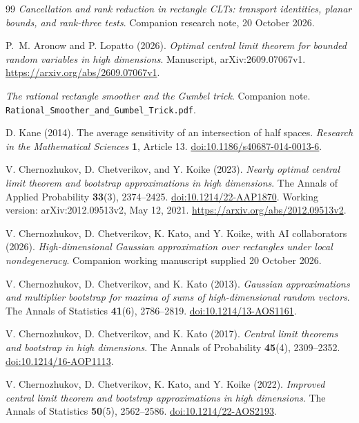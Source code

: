 \documentclass[11pt,letterpaper]{article}
\theoremstyle{remark}
\begin{document}
\begin{thebibliography}{99}
\emph{Cancellation and rank reduction in rectangle CLTs:
transport identities, planar bounds, and rank-three tests}.
Companion research note, 20 October 2026.

P.~M. Aronow and P. Lopatto (2026).
\emph{Optimal central limit theorem for bounded random variables in high dimensions}.
Manuscript, arXiv:2609.07067v1.
\url{https://arxiv.org/abs/2609.07067v1}.

\emph{The rational rectangle smoother and the Gumbel trick}.
Companion note.
\nolinkurl{Rational_Smoother_and_Gumbel_Trick.pdf}.

D. Kane (2014).
The average sensitivity of an intersection of half spaces.
\emph{Research in the Mathematical Sciences} \textbf{1}, Article 13.
\href{https://doi.org/10.1186/s40687-014-0013-6}{doi:10.1186/s40687-014-0013-6}.

V. Chernozhukov, D. Chetverikov, and Y. Koike (2023).
\emph{Nearly optimal central limit theorem and bootstrap approximations
in high dimensions}.
The Annals of Applied Probability \textbf{33}(3), 2374--2425.
\href{https://doi.org/10.1214/22-AAP1870}{doi:10.1214/22-AAP1870}.
Working version: arXiv:2012.09513v2, May 12, 2021.
\url{https://arxiv.org/abs/2012.09513v2}.

V. Chernozhukov, D. Chetverikov, K. Kato, and Y. Koike,
with AI collaborators (2026).
\emph{High-dimensional Gaussian approximation over rectangles under
local nondegeneracy}. Companion working manuscript supplied
20 October 2026.

V. Chernozhukov, D. Chetverikov, and K. Kato (2013).
\emph{Gaussian approximations and multiplier bootstrap for maxima of
sums of high-dimensional random vectors}.
The Annals of Statistics \textbf{41}(6), 2786--2819.
\href{https://doi.org/10.1214/13-AOS1161}{doi:10.1214/13-AOS1161}.

V. Chernozhukov, D. Chetverikov, and K. Kato (2017).
\emph{Central limit theorems and bootstrap in high dimensions}.
The Annals of Probability \textbf{45}(4), 2309--2352.
\href{https://doi.org/10.1214/16-AOP1113}{doi:10.1214/16-AOP1113}.

V. Chernozhukov, D. Chetverikov, K. Kato, and Y. Koike (2022).
\emph{Improved central limit theorem and bootstrap approximations in
high dimensions}. The Annals of Statistics \textbf{50}(5), 2562--2586.
\href{https://doi.org/10.1214/22-AOS2193}{doi:10.1214/22-AOS2193}.


\end{thebibliography}
\end{document}
